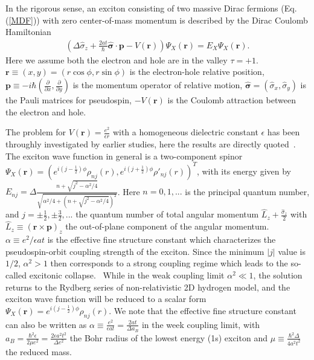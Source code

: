 \documentclass[prb,twocolumn,amsmath,amssymb,superscriptaddress,showpacs]{revtex4}
\begin{document}
In the rigorous sense, an exciton consisting of two massive Dirac fermions (Eq. (\ref{MDF})) with zero center-of-mass momentum is described by the Dirac Coulomb Hamiltonian~\cite{TMD MDF Coulomb PRB13, Koch p-state brightness 2015}
\begin{align}
\left(\Delta\hat{\sigma}_{z}+\frac{2at}{\hbar}\hat{\boldsymbol{\sigma}}\cdot\mathbf{p}-V(\mathbf{r})\right)\Psi_{X}(\mathbf{r})=E_{X}\Psi_{X}(\mathbf{r}).
\label{ExcitonEquation}
\end{align} 
Here we assume both the electron and hole are in the valley $\tau=+1$. $\mathbf{r}\equiv(x,y)=\left(r\cos\phi,r\sin\phi\right)$ is the electron-hole relative position, $\mathbf{p}\equiv-i\hbar\left(\frac{\partial}{\partial{x}},\frac{\partial}{\partial{y}}\right)$ is the momentum operator of relative motion, $\hat{\boldsymbol{\sigma}}=(\hat{\sigma}_x,\hat{\sigma}_y)$ is the Pauli matrices for pseudospin, $-V(\mathbf{r})$ is the Coulomb attraction between the electron and hole. 

The problem for $V(\mathbf{r})=\frac{e^{2}}{\epsilon r}$ with a homogeneous dielectric constant $\epsilon$ has been throughly investigated by earlier studies, here the results are directly quoted~\cite{TMD MDF Coulomb PRB13, Koch p-state brightness 2015}. The exciton wave function in general is a two-component spinor $\Psi_{X}(\mathbf{r})=\left(e^{i\left(j-\frac{1}{2}\right)\phi}\rho_{nj}\left(r\right),e^{i\left(j+\frac{1}{2}\right)\phi}\rho'_{nj}\left(r\right)\right)^{T}$, with its energy given by $E_{nj}=\Delta\frac{n+\sqrt{j^{2}-\alpha^{2}/4}}{\sqrt{\alpha^{2}/4+\left(n+\sqrt{j^{2}-\alpha^{2}/4}\right)^{2}}}$. Here $n=0,1,...$ is the principal quantum number, and $j=\pm\frac{1}{2},\pm\frac{3}{2},...$ the quantum number of total angular momentum $\hat{L}_{z}+\frac{\hat{\sigma}_{z}}{2}$ with $\hat{L}_{z}\equiv\left(\mathbf{r}\times\mathbf{p}\right)_{z}$ the out-of-plane component of the angular momentum. $\alpha\equiv e^{2}/\epsilon at$ is the effective fine structure constant which characterizes the pseudospin-orbit coupling strength of the exciton. Since the minimum $|j|$ value is $1/2$, $\alpha^2>1$ then corresponds to a strong coupling regime which leads to the so-called excitonic collapse.~\cite{TMD MDF Coulomb PRB13, Koch p-state brightness 2015} While in the weak coupling limit $\alpha^{2}\ll 1$, the solution returns to the Rydberg series of non-relativistic 2D hydrogen model, and the exciton wave function will be reduced to a scalar form $\Psi_{X}(\mathbf{r})=e^{i\left(j-\frac{1}{2}\right)\phi}\rho_{nj}\left(r\right)$. We note that the effective fine structure constant can also be written as $\alpha\equiv\frac{e^{2}}{\epsilon at}=\frac{2at}{\Delta a_{B}}$ in the week coupling limit, with $a_{B}=\frac{\hbar^{2}\epsilon}{2\mu e^{2}}=\frac{2\epsilon a^{2}t^{2}}{\Delta e^{2}}$ the Bohr radius of the lowest energy (1s) exciton and $\mu\equiv\frac{\hbar^{2}\Delta}{4a^{2}t^{2}}$ the reduced mass. 
\end{document}
